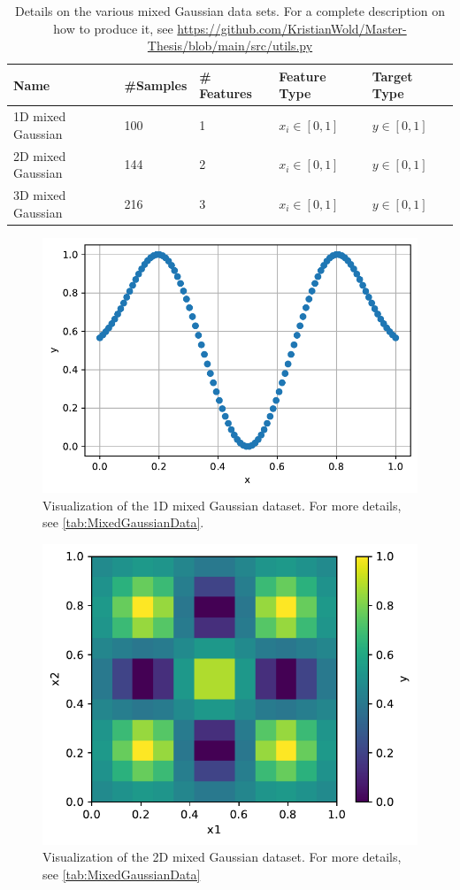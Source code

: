 \begin{table}[H]
\begin{tabular}{|l|l|l|l|l|}
\hline
 Name& \#Samples&  \# Features& Feature Type& Target Type \\ \hline
 1D mixed Gaussian&  100&  1& $x_i \in [0,1]$ & $y \in [0,1]$  \\ \hline
 2D mixed Gaussian&  144&  2& $x_i \in [0,1]$ & $y \in [0,1]$ \\ \hline
 3D mixed Gaussian&  216&  3& $x_i \in [0,1]$ & $y \in [0,1]$ \\ \hline
\end{tabular}
\caption{Details on the various mixed Gaussian data sets. For a complete description on how to produce it, see \url{https://github.com/KristianWold/Master-Thesis/blob/main/src/utils.py}}
\label{tab:MixedGaussianData}
\end{table}

\begin{figure}[H]
    \centering
    \includegraphics[width=12cm]{latex/figures/gaussian_1D.pdf}
    \caption{Visualization of the 1D mixed Gaussian dataset. For more details, see \autoref{tab:MixedGaussianData}.} 
    \label{fig:mixed Gaussian 1D}
\end{figure}

\begin{figure}[H]
    \centering
    \includegraphics[width=12cm]{latex/figures/gaussian_2D.pdf}
    \caption{Visualization of the 2D mixed Gaussian dataset. For more details, see \autoref{tab:MixedGaussianData}} 
    \label{fig:mixed Gaussian 2D}
\end{figure}

